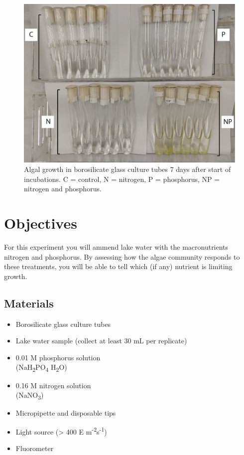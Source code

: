 \documentclass[11pt,]{article}
\begin{document}
\begin{figure}
\centering
\includegraphics{../_chapter_materials/bioassay_picture.png}
\caption{Algal growth in borosilicate glass culture tubes 7 days after
start of incubations. C = control, N = nitrogen, P = phosphorus, NP =
nitrogen and phosphorus.}
\end{figure}

\section{Objectives}\label{objectives}

For this experiment you will ammend lake water with the macronutrients
nitrogen and phosphorus. By assessing how the algae community responds
to these treatments, you will be able to tell which (if any) nutrient is
limiting growth. \bigskip

\pagebreak

\subsection{Materials}\label{materials}

\begin{multicols}{2}
\begin{itemize}{}
  \item Borosilicate glass culture tubes
  \item Lake water sample (collect at least 30 mL per replicate)
  \item 0.01 M phosphorus solution \\(NaH\textsubscript{2}PO\textsubscript{4} \textbullet  H\textsubscript{2}O)
  \item 0.16 M nitrogen solution \\ (NaNO\textsubscript{3})
  \item Micropipette and disposable tips
  \item Light source (> 400 \textmu E m\textsuperscript{-2}s\textsuperscript{-1})
  \item Fluorometer
\end{itemize}
\end{multicols}
\end{document}
